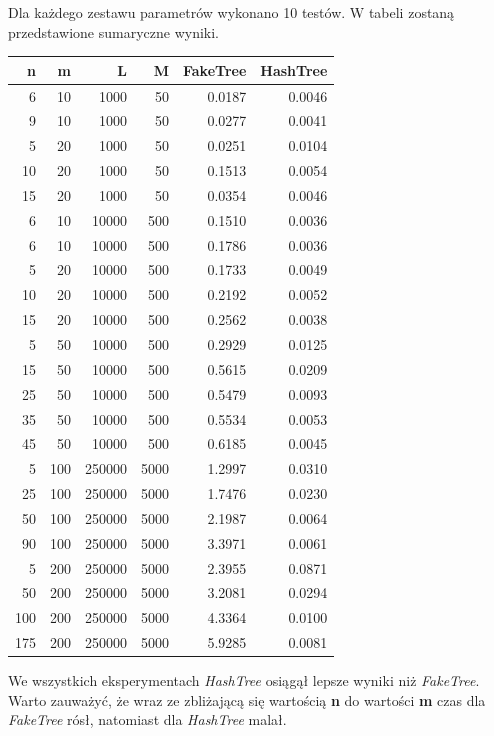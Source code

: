 \documentclass[a4paper,12pt]{article}
\begin{document}
Dla każdego zestawu parametrów wykonano 10 testów. W tabeli zostaną przedstawione sumaryczne wyniki. \\

\begin{tabular}{|r|r|r|r|r|r|}
\hline
n & m & L & M & FakeTree & HashTree \\ \hline
6 & 10 & 1000 & 50 & 0.0187 & 0.0046\\ \hline
9 & 10 & 1000 & 50 & 0.0277 & 0.0041\\ \hline
5 & 20 & 1000 & 50 & 0.0251 & 0.0104\\ \hline
10 & 20 & 1000 & 50 & 0.1513 & 0.0054\\ \hline
15 & 20 & 1000 & 50 & 0.0354 & 0.0046\\ \hline
6 & 10 & 10000 & 500 & 0.1510 & 0.0036\\ \hline
6 & 10 & 10000 & 500 & 0.1786 & 0.0036\\ \hline
5 & 20 & 10000 & 500 & 0.1733 & 0.0049\\ \hline
10 & 20 & 10000 & 500 & 0.2192 & 0.0052\\ \hline
15 & 20 & 10000 & 500 & 0.2562 & 0.0038\\ \hline
5 & 50 & 10000 & 500 & 0.2929 & 0.0125\\ \hline
15 & 50 & 10000 & 500 & 0.5615 & 0.0209\\ \hline
25 & 50 & 10000 & 500 & 0.5479 & 0.0093\\ \hline
35 & 50 & 10000 & 500 & 0.5534 & 0.0053\\ \hline
45 & 50 & 10000 & 500 & 0.6185 & 0.0045\\ \hline
5 & 100 & 250000 & 5000 & 1.2997 & 0.0310\\ \hline
25 & 100 & 250000 & 5000 & 1.7476 & 0.0230\\ \hline
50 & 100 & 250000 & 5000 & 2.1987 & 0.0064\\ \hline
90 & 100 & 250000 & 5000 & 3.3971 & 0.0061\\ \hline
5 & 200 & 250000 & 5000 & 2.3955 & 0.0871\\ \hline
50 & 200 & 250000 & 5000 & 3.2081 & 0.0294\\ \hline
100 & 200 & 250000 & 5000 & 4.3364 & 0.0100\\ \hline
175 & 200 & 250000 & 5000 & 5.9285 & 0.0081\\ \hline
\end{tabular}

We wszystkich eksperymentach \textit{HashTree} osiągął lepsze wyniki niż \textit{FakeTree}. Warto zauważyć, że wraz ze zbliżającą się wartością {\bf n} do wartości {\bf m} czas dla \textit{FakeTree} rósł, natomiast dla \textit{HashTree} malał.
\end{document}
